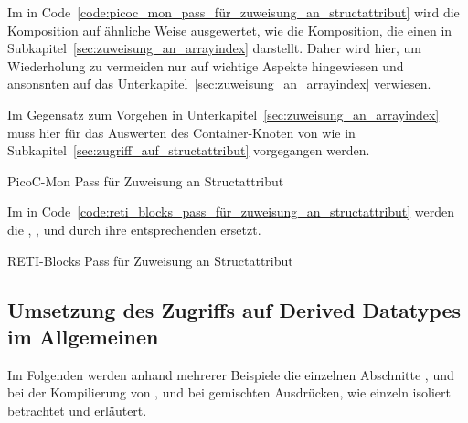 Im  in Code~\ref{code:picoc_mon_pass_für_zuweisung_an_structattribut} wird die Komposition  auf ähnliche Weise ausgewertet, wie die Komposition, die einen   in Subkapitel~\ref{sec:zuweisung_an_arrayindex} darstellt. Daher wird hier, um Wiederholung zu vermeiden nur auf wichtige Aspekte hingewiesen und ansonsnten auf das Unterkapitel~\ref{sec:zuweisung_an_arrayindex} verwiesen.

Im Gegensatz zum Vorgehen in Unterkapitel~\ref{sec:zuweisung_an_arrayindex} muss hier für das Auswerten des  Container-Knoten  von  wie in Subkapitel~\ref{sec:zugriff_auf_structattribut} vorgegangen werden.

\begin{code}
  \centering
  \caption{PicoC-Mon Pass für Zuweisung an Structattribut}
  \label{code:picoc_mon_pass_für_zuweisung_an_structattribut}
\end{code}

Im  in Code~\ref{code:reti_blocks_pass_für_zuweisung_an_structattribut} werden die  , ,  und  durch ihre entsprechenden  ersetzt.

\begin{code}
  \centering
  \caption{RETI-Blocks Pass für Zuweisung an Structattribut}
  \label{code:reti_blocks_pass_für_zuweisung_an_structattribut}
\end{code}

\subsection{Umsetzung des Zugriffs auf Derived Datatypes im Allgemeinen}

Im Folgenden werden anhand mehrerer Beispiele die einzelnen Abschnitte ,  und  bei der Kompilierung von ,  und  bei gemischten Ausdrücken, wie  einzeln isoliert betrachtet und erläutert.

